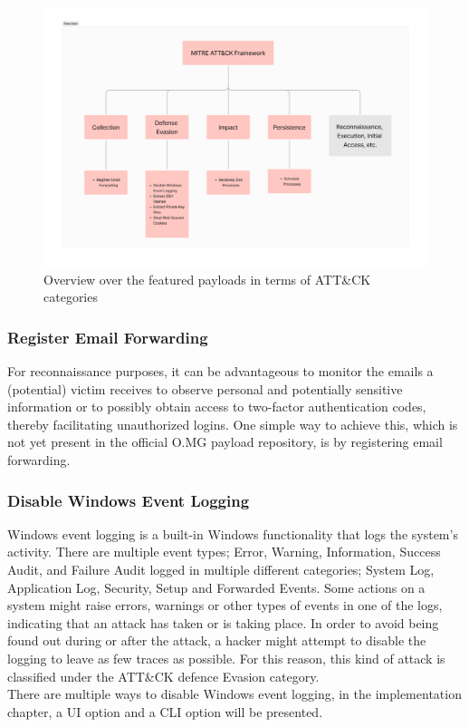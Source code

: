 \begin{figure}[H]
    \centering
    \includegraphics[width=1\linewidth]{visuals/payloads_overview.png}
    \caption{Overview over the featured payloads in terms of ATT\&CK categories}
\end{figure}





\subsubsection{Register Email Forwarding}

For reconnaissance purposes, it can be advantageous to monitor the emails a (potential) victim receives to observe personal and potentially sensitive information or to possibly obtain access to two-factor authentication codes, thereby facilitating unauthorized logins. One simple way to achieve this, which is not yet present in the official O.MG payload repository, is by registering email forwarding. 


\subsubsection{Disable Windows Event Logging}

Windows event logging is a built-in Windows functionality that logs the system's activity. There are multiple event types; Error, Warning, Information, Success Audit, and Failure Audit logged in multiple different categories; System Log, Application Log, Security, Setup and Forwarded Events. 
Some actions on a system might raise errors, warnings or other types of events in one of the logs, indicating that an attack has taken or is taking place. In order to avoid being found out during or after the attack, a hacker might attempt to disable the logging to leave as few traces as possible. For this reason, this kind of attack is classified under the ATT\&CK defence Evasion category. \\
There are multiple ways to disable Windows event logging, in the implementation chapter, a UI option and a CLI option will be presented. 


